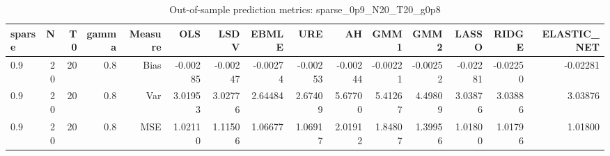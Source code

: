 \begin{table}[!htbp]\centering
\caption{Out-of-sample prediction metrics: sparse_0p9_N20_T20_g0p8}
\label{tab:table3_sparse_0p9_N20_T20_g0p8}
\begin{tabular}{lrrrrrrrrrrrrrr}
\hline
sparse & N & T0 & gamma & Measure & OLS & LSDV & EBMLE & URE & AH & GMM1 & GMM2 & LASSO & RIDGE & ELASTIC_NET \\
\hline
0.9 & 20 & 20 & 0.8 & Bias & -0.00285 & -0.00247 & -0.00274 & -0.00253 & -0.00244 & -0.00221 & -0.00252 & -0.02281 & -0.02250 & -0.02281 \\
0.9 & 20 & 20 & 0.8 & Var & 3.01953 & 3.02776 & 2.64484 & 2.67409 & 5.67700 & 5.41267 & 4.49809 & 3.03876 & 3.03886 & 3.03876 \\
0.9 & 20 & 20 & 0.8 & MSE & 1.02110 & 1.11506 & 1.06677 & 1.06917 & 2.01912 & 1.84807 & 1.39956 & 1.01800 & 1.01796 & 1.01800 \\
\hline
\end{tabular}
\end{table}

